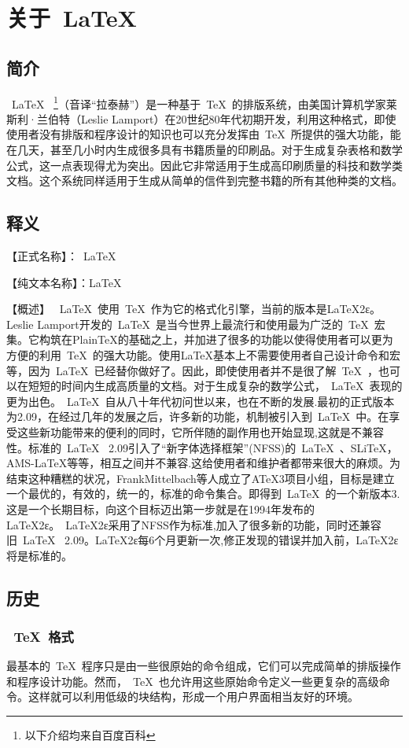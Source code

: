 \chapter{关于~\LaTeX{}~}
\label{chap:introduction}
\section{简介}
~\LaTeX{}~ \footnote{以下介绍均来自百度百科}（音译“拉泰赫”）是一种基于~\TeX{}~的排版系统，由美国计算机学家莱斯利·兰伯特（Leslie Lamport）在20世纪80年代初期开发，利用这种格式，即使使用者没有排版和程序设计的知识也可以充分发挥由~\TeX{}~所提供的强大功能，能在几天，甚至几小时内生成很多具有书籍质量的印刷品。对于生成复杂表格和数学公式，这一点表现得尤为突出。因此它非常适用于生成高印刷质量的科技和数学类文档。这个系统同样适用于生成从简单的信件到完整书籍的所有其他种类的文档。
\section{释义}
【正式名称】：~\LaTeX{}~


【纯文本名称】：LaTeX


【概述】
~\LaTeX{}~使用~\TeX{}~作为它的格式化引擎，当前的版本是LaTeX2ε。Leslie Lamport开发的~\LaTeX{}~是当今世界上最流行和使用最为广泛的~\TeX{}~宏集。它构筑在PlainTeX的基础之上，并加进了很多的功能以使得使用者可以更为方便的利用~\TeX{}~的强大功能。使用LaTeX基本上不需要使用者自己设计命令和宏等，因为~\LaTeX{}~已经替你做好了。因此，即使使用者并不是很了解~\TeX{}~，也可以在短短的时间内生成高质量的文档。对于生成复杂的数学公式，~\LaTeX{}~表现的更为出色。~\LaTeX{}~自从八十年代初问世以来，也在不断的发展.最初的正式版本为2.09，在经过几年的发展之后，许多新的功能，机制被引入到~\LaTeX{}~中。在享受这些新功能带来的便利的同时，它所伴随的副作用也开始显现,这就是不兼容性。标准的~\LaTeX{}~ 2.09引入了“新字体选择框架”(NFSS)的~\LaTeX{}~、SLiTeX，AMS-LaTeX等等，相互之间并不兼容.这给使用者和维护者都带来很大的麻烦。为结束这种糟糕的状况，FrankMittelbach等人成立了ATeX3项目小组，目标是建立一个最优的，有效的，统一的，标准的命令集合。即得到~\LaTeX{}~的一个新版本3.这是一个长期目标，向这个目标迈出第一步就是在1994年发布的LaTeX2ε。~LaTeX2ε采用了NFSS作为标准,加入了很多新的功能，同时还兼容旧~\LaTeX{}~ 2.09。LaTeX2ε每6个月更新一次,修正发现的错误并加入前，LaTeX2ε将是标准的。
\section{历史}
\subsection{~\TeX{}~格式}
最基本的~\TeX{}~程序只是由一些很原始的命令组成，它们可以完成简单的排版操作和程序设计功能。然而，~\TeX{}~也允许用这些原始命令定义一些更复杂的高级命令。这样就可以利用低级的块结构，形成一个用户界面相当友好的环境。


